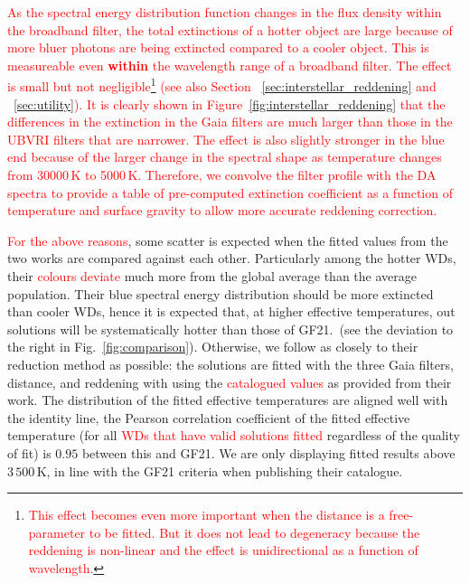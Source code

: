 \documentclass[fleqn,usenatbib]{rasti}
\begin{document}
\textcolor{red}{
As the spectral energy distribution function changes in the flux density
within the broadband filter, the total extinctions of a hotter object are
large because of more bluer photons are being extincted compared to a cooler
object. This is measureable even \textbf{within} the wavelength range of a
broadband filter. The effect is small but not
negligible\footnote{\textcolor{red}{This effect becomes even more important
when the distance is a free-parameter to be fitted. But it does not lead to
degeneracy because the reddening is non-linear and the effect is
unidirectional as a function of wavelength.}} (see also Section
\textsection~\ref{sec:interstellar_reddening} and \textsection~\ref{sec:utility}).
It is clearly shown in Figure~\ref{fig:interstellar_reddening} that the
differences in the extinction in the Gaia filters are much larger than
those in the UBVRI filters that are narrower. The effect is also slightly
stronger in the blue end because of the larger change in the spectral
shape as temperature changes from 30000\,K to 5000\,K. Therefore, we
convolve the filter profile with the DA spectra to provide a table of
pre-computed extinction coefficient as a function of temperature and
surface gravity to allow more accurate reddening correction.}

\textcolor{red}{For the above reasons}, some scatter is expected when the
fitted values from the two works are compared against each other.
Particularly among the hotter WDs, their \textcolor{red}{colours deviate}
much more from the global average than the average population. Their blue
spectral energy distribution should be more extincted than cooler WDs,
hence it is expected that, at higher effective temperatures, out solutions
will be systematically hotter than those of GF21.~(see the deviation to
the right in Fig.~\ref{fig:comparison}). Otherwise, we follow as closely
to their reduction method as possible: the solutions are fitted with the
three Gaia filters, distance, and reddening with using the
\textcolor{red}{catalogued values} as provided from their work.
The distribution of the fitted effective temperatures are aligned well with
the identity line, the Pearson correlation coefficient of the fitted effective
temperature (for all \textcolor{red}{WDs that have valid solutions fitted}
regardless of the quality of fit) is $0.95$ between this and GF21. We are
only displaying fitted results above $3\,500$\,K, in line with the GF21
criteria when publishing their catalogue.
\end{document}
